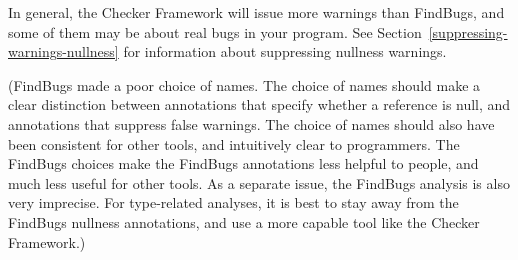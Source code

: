 In general, the Checker Framework will issue more warnings than FindBugs,
and some of them may be about real bugs in your program.
See Section~\ref{suppressing-warnings-nullness} for information about
suppressing nullness warnings.

(FindBugs made a poor choice of names.  The choice of names should make a
clear distinction between annotations that specify whether a reference is
null, and annotations that suppress false warnings.  The choice of names
should also have been consistent for other tools, and intuitively clear to
programmers.  The FindBugs choices make the FindBugs annotations less
helpful to people, and much less useful for other tools.  As a separate
issue, the FindBugs
analysis is also very imprecise.  For type-related analyses, it is best to
stay away from the FindBugs nullness annotations, and use a more capable
tool like the Checker Framework.)



%
%
%
%
%
%
%


